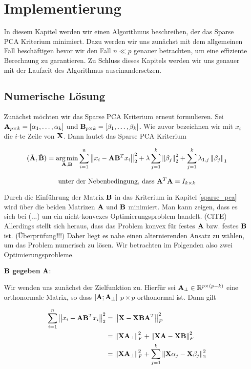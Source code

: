 \chapter{Implementierung}

\label{implementation}

In diesem Kapitel werden wir einen Algorithmus beschreiben, der das Sparse PCA Kriterium minimiert. Dazu werden wir uns zunächst mit dem allgemeinen Fall beschäftigen bevor wir den Fall $n \ll p$ genauer betrachten, um eine effiziente Berechnung zu garantieren. Zu Schluss dieses Kapitels werden wir uns genauer mit der Laufzeit des Algorithmus auseinandersetzen. 

\section{Numerische Lösung}
\label{spca_numerical_solution}

Zunächst möchten wir das Sparse PCA Kriterium erneut formulieren. Sei $\mathbf{A}_{p \times k} = [ \alpha_1, \ldots ,\alpha_k ]$ und $\mathbf{B}_{p \times k} = [ \beta_1, \ldots ,\beta_k ]$. Wie zuvor bezeichnen wir mit $x_i$ die $i$-te Zeile von $\mathbf{X}$. Dann lautet das Sparse PCA Kriterium

$$(\hat{\mathbf{A}}, \hat{\mathbf{B}}) = \operatorname*{arg\,min}_{\mathbf{A}, \mathbf{B}} \sum_{i=1}^{n} \left\lVert x_i - \mathbf{A}\mathbf{B}^Tx_i \right\rVert_2^2 + \lambda \sum_{j=1}^{k}\left\lVert \beta_j \right\rVert_2^2 + \sum_{j=1}^k \lambda_{1,j} \left\lVert \beta_j \right\rVert_1$$

$$\text{unter der Nebenbedingung, dass } \mathbf{A}^T\mathbf{A} = I_{k \times k}$$

Durch die Einführung der Matrix $\mathbf{B}$ in das Kriterium in Kapitel \ref{sparse_pca} wird über die beiden Matrizen $\mathbf{A}$ und $\mathbf{B}$ minimiert. Man kann zeigen, dass es sich bei (...) um ein nicht-konvexes Optimierungsproblem handelt. (CITE) Allerdings stellt sich heraus, dass das Problem konvex für festes $\mathbf{A}$ bzw. festes $\mathbf{B}$ ist. (Überprüfung!!!) Daher liegt es nahe einen alternierenden Ansatz zu wählen, um das Problem numerisch zu lösen. Wir betrachten im Folgenden also zwei Optimierungsprobleme.

$\mathbf{B}$ \textbf{gegeben} $\mathbf{A}$:

Wir wenden uns zunächst der Zielfunktion zu. Hierfür sei $\mathbf{A}_{\perp} \in \mathbb{R}^{p \times (p-k)}$ eine orthonormale Matrix, so dass $[\mathbf{A} ; \mathbf{A}_{\perp}]$ $p \times p$ orthonormal ist. Dann gilt

\begin{align*}
\sum_{i=1}^{n} \left\lVert x_i - \mathbf{A}\mathbf{B}^Tx_i \right\rVert_2^2 & = \left\lVert \mathbf{X} - \mathbf{X} \mathbf{B} \mathbf{A}^T \right\rVert_F^{2}\\
& = \left\lVert \mathbf{X} \mathbf{A}_{\perp} \right\rVert_F^2 + \left\lVert \mathbf{X} \mathbf{A} - \mathbf{X} \mathbf{B} \right\rVert_F^2\\
& = \left\lVert \mathbf{X} \mathbf{A}_{\perp} \right\rVert_F^2 + \sum_{j=1}^{k}\left\lVert \mathbf{X} \alpha_j - \mathbf{X}\beta_j \right\rVert_2^2
\end{align*}

